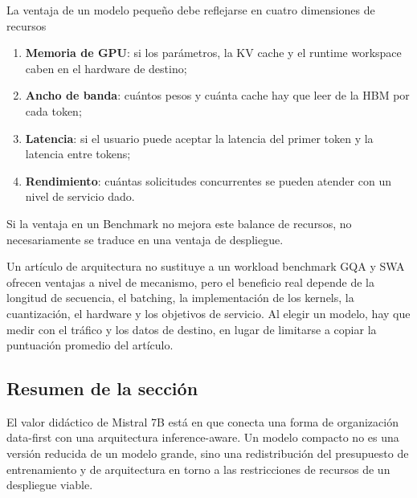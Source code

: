 \begin{importantbox}{La ventaja de un modelo pequeño debe reflejarse en cuatro dimensiones de recursos}
\begin{enumerate}
  \item \textbf{Memoria de GPU}: si los parámetros, la KV cache y el runtime workspace caben en el hardware de destino;
  \item \textbf{Ancho de banda}: cuántos pesos y cuánta cache hay que leer de la HBM por cada token;
  \item \textbf{Latencia}: si el usuario puede aceptar la latencia del primer token y la latencia entre tokens;
  \item \textbf{Rendimiento}: cuántas solicitudes concurrentes se pueden atender con un nivel de servicio dado.
\end{enumerate}
Si la ventaja en un Benchmark no mejora este balance de recursos, no necesariamente se traduce en una ventaja de despliegue.
\end{importantbox}

\begin{warningbox}{Un artículo de arquitectura no sustituye a un workload benchmark}
GQA y SWA ofrecen ventajas a nivel de mecanismo, pero el beneficio real depende de la longitud de secuencia, el batching, la implementación de los kernels, la cuantización, el hardware y los objetivos de servicio. Al elegir un modelo, hay que medir con el tráfico y los datos de destino, en lugar de limitarse a copiar la puntuación promedio del artículo.
\end{warningbox}

\subsection{Resumen de la sección}

El valor didáctico de Mistral 7B está en que conecta una forma de organización data-first con una arquitectura inference-aware. Un modelo compacto no es una versión reducida de un modelo grande, sino una redistribución del presupuesto de entrenamiento y de arquitectura en torno a las restricciones de recursos de un despliegue viable.
